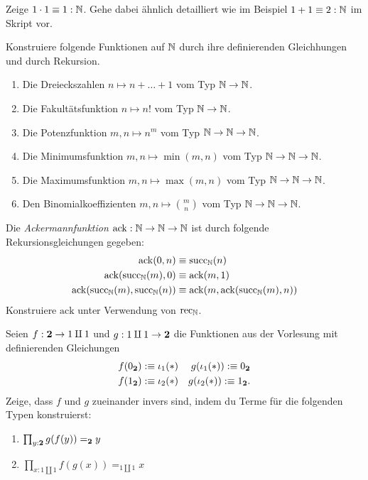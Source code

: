 \documentclass{uebung}
\begin{document}

\begin{exercise}
  Zeige $1\cdot 1\equiv 1:\mathbb{N}$.
  Gehe dabei ähnlich detailliert wie im Beispiel $1+1\equiv 2:\mathbb{N}$ im Skript vor.
\end{exercise}

\begin{exercise}
  Konstruiere folgende Funktionen auf $\mathbb{N}$ durch ihre definierenden Gleichhungen und durch Rekursion.
  \begin{enumerate}
    \item Die Dreieckszahlen $n\mapsto n+\dots+1$ vom Typ $\mathbb{N}\to\mathbb{N}$.
    \item Die Fakultätsfunktion $n\mapsto n!$ vom Typ $\mathbb{N}\to\mathbb{N}$.
    \item Die Potenzfunktion $m,n\mapsto n^m$ vom Typ $\mathbb{N}\to\mathbb{N}\to\mathbb{N}$.
    \item Die Minimumsfunktion $m,n\mapsto\min(m,n)$ vom Typ $\mathbb{N}\to\mathbb{N}\to\mathbb{N}$.
    \item Die Maximumsfunktion $m,n\mapsto\max(m,n)$ vom Typ $\mathbb{N}\to\mathbb{N}\to\mathbb{N}$.
    \item Den Binomialkoeffizienten $m,n\mapsto\binom{m}{n}$ vom Typ $\mathbb{N}\to\mathbb{N}\to\mathbb{N}$.
  \end{enumerate}
\end{exercise}

\begin{exercise}
  Die \emph{Ackermannfunktion} $\mathrm{ack}:\mathbb{N}\to\mathbb{N}\to\mathbb{N}$ ist durch folgende Rekursionsgleichungen gegeben:
  \begin{align*}
    \mathrm{ack}(0,n)&\equiv\mathrm{succ}_{\mathbb{N}}(n)\\
    \mathrm{ack}(\mathrm{succ}_{\mathbb{N}}(m),0)&\equiv\mathrm{ack}(m,1)\\
    \mathrm{ack}(\mathrm{succ}_{\mathbb{N}}(m),\mathrm{succ}_{\mathbb{N}}(n))&\equiv\mathrm{ack}(m,\mathrm{ack}(\mathrm{succ}_{\mathbb{N}}(m),n))
  \end{align*}
  Konstruiere $\mathrm{ack}$ unter Verwendung von $\mathrm{rec}_{\mathbb{N}}$.
\end{exercise}


\begin{exercise}
  Seien $f:\mathbf{2}\to 1\amalg 1$ und $g:1\amalg 1\to\mathbf{2}$ die Funktionen aus der Vorlesung mit definierenden Gleichungen
  \begin{align*}
    f(0_{\mathbf{2}})&:\equiv\iota_1(\ast) &g(\iota_1(\ast)):\equiv 0_{\mathbf{2}}\\
    f(1_{\mathbf{2}})&:\equiv\iota_2(\ast)&g(\iota_2(\ast)):\equiv 1_{\mathbf{2}}.
  \end{align*}
  Zeige, dass $f$ und $g$ zueinander invers sind, indem du Terme für die folgenden Typen konstruierst:
  \begin{enumerate}
    \item $\prod_{y:\mathbf{2}} g(f(y))=_{\mathbf{2}} y$
    \item $\prod_{x:1\amalg 1} f(g(x))=_{1\amalg 1} x$
  \end{enumerate}
\end{exercise}
\end{document}
